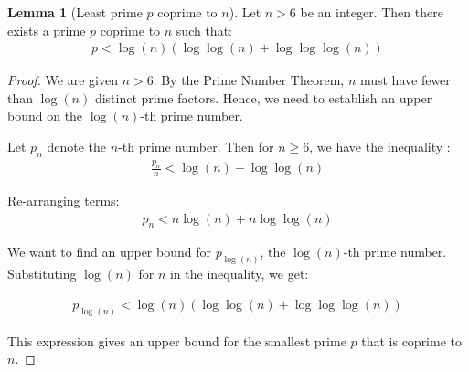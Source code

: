 \documentclass{article}
\theoremstyle{plain}
\theoremstyle{definition}
\newtheorem{lemma}{Lemma}
\begin{document}
\begin{lemma}[Least prime $p$ coprime to $n$] \label{lemma:leastcoprime}
Let $n > 6$ be an integer. Then there exists a prime $p$ coprime to $n$ such that:
\begin{align}
    p < \log(n) \left( \log\log(n) + \log\log\log(n) \right)
\end{align}
\end{lemma}
\begin{proof}
We are given $n > 6$. By the Prime Number Theorem, $n$ must have fewer than $\log(n)$ distinct prime factors. Hence, we need to establish an upper bound on the $\log(n)$-th prime number.

Let $p_n$ denote the $n$-th prime number. Then for $n \geq 6$, we have the inequality \cite{rosser1941primebounds}:
\begin{align}
    \frac{p_n}{n} < \log(n) + \log\log(n)
\end{align}

Re-arranging terms:
\begin{align}
    p_n < n \log(n) + n \log\log(n)
\end{align}

We want to find an upper bound for $p_{\log(n)}$, the $\log(n)$-th prime number. Substituting $\log(n)$ for $n$ in the inequality, we get:

\begin{align}
p_{\log(n)} < \log(n) \left( \log\log (n) + \log\log\log(n) \right)
\end{align}

This expression gives an upper bound for the smallest prime $p$ that is coprime to $n$.
\end{proof}
\end{document}
